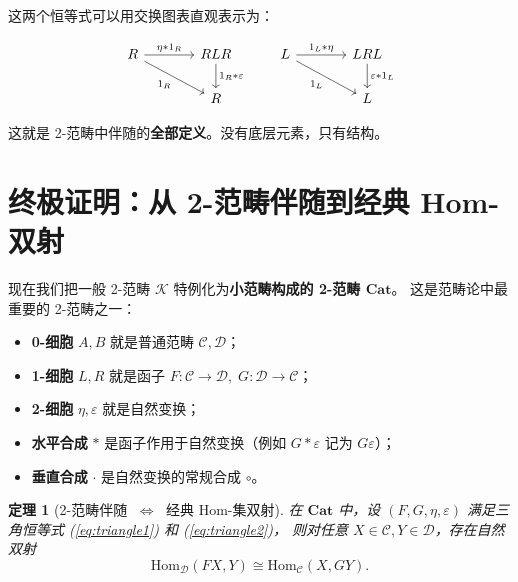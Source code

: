 \documentclass[12pt,a4paper]{ctexart}
\newtheorem{theorem}{定理}[section]
\theoremstyle{definition}
\newcommand{\cat}[1]{\mathbf{#1}}
\newcommand{\Cat}{\cat{Cat}}
\newcommand{\Hom}{\mathrm{Hom}}
\newcommand{\liff}{\;\Longleftrightarrow\;}
\begin{document}
这两个恒等式可以用交换图表直观表示为：

\[
\begin{tikzcd}[column sep=large]
R \ar[r, "\eta \ast 1_R"] \ar[dr, "1_R"'] & RLR \ar[d, "1_R \ast \varepsilon"] \\
& R
\end{tikzcd}
\qquad
\begin{tikzcd}[column sep=large]
L \ar[r, "1_L \ast \eta"] \ar[dr, "1_L"'] & LRL \ar[d, "\varepsilon \ast 1_L"] \\
& L
\end{tikzcd}
\]

这就是 2-范畴中伴随的\textbf{全部定义}。没有底层元素，只有结构。

\section{终极证明：从 2-范畴伴随到经典 Hom-双射}

现在我们把一般 2-范畴 $\mathcal{K}$ 特例化为\textbf{小范畴构成的 2-范畴 $\Cat$}。
这是范畴论中最重要的 2-范畴之一：

\begin{itemize}[leftmargin=*]
    \item \textbf{0-细胞} $A, B$ 就是普通范畴 $\mathcal{C}, \mathcal{D}$；
    \item \textbf{1-细胞} $L, R$ 就是函子 $F: \mathcal{C} \to \mathcal{D},\; G: \mathcal{D} \to \mathcal{C}$；
    \item \textbf{2-细胞} $\eta, \varepsilon$ 就是自然变换；
    \item \textbf{水平合成} $\ast$ 是函子作用于自然变换（例如 $G \ast \varepsilon$ 记为 $G\varepsilon$）；
    \item \textbf{垂直合成} $\cdot$ 是自然变换的常规合成 $\circ$。
\end{itemize}

\begin{theorem}[2-范畴伴随 $\liff$ 经典 Hom-集双射]
在 $\Cat$ 中，设 $(F, G, \eta, \varepsilon)$ 满足三角恒等式 (\ref{eq:triangle1}) 和 (\ref{eq:triangle2})，
则对任意 $X \in \mathcal{C}, Y \in \mathcal{D}$，存在自然双射
\[
\Hom_{\mathcal{D}}(FX, Y) \cong \Hom_{\mathcal{C}}(X, GY).
\]
\end{theorem}
\end{document}
